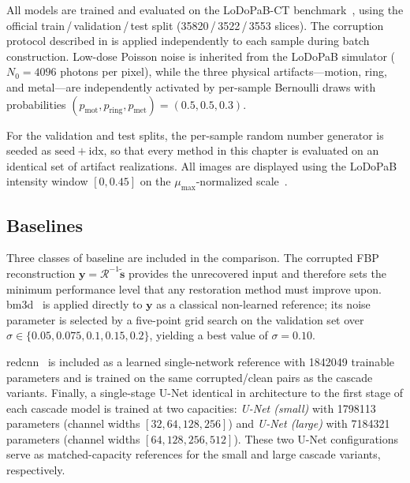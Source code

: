 All models are trained and evaluated on the LoDoPaB-CT benchmark~\cite{Leuschner2021}, using the official train\,/\,validation\,/\,test split (\num{35820}\,/\,\num{3522}\,/\,\num{3553} slices). The corruption protocol described in  is applied independently to each sample during batch construction. Low-dose Poisson noise is inherited from the LoDoPaB simulator (\(N_0=\num{4096}\) photons per pixel), while the three physical artifacts---motion, ring, and metal---are independently activated by per-sample Bernoulli draws with probabilities \((p_\mathrm{mot}, p_\mathrm{ring}, p_\mathrm{met}) = (0.5, 0.5, 0.3)\).

For the validation and test splits, the per-sample random number generator is seeded as \(\mathrm{seed}+\mathrm{idx}\), so that every method in this chapter is evaluated on an identical set of artifact realizations. All images are displayed using the LoDoPaB intensity window \([0, 0.45]\) on the \(\mu_{\max}\)-normalized scale~\cite{Leuschner2021}.
\subsection{Baselines}
\label{subsec:exp_baselines}

Three classes of baseline are included in the comparison. The corrupted FBP reconstruction $\mathbf{y} = \mathcal{R}^{-1}\tilde{\mathbf{s}}$ provides the unrecovered input and therefore sets the minimum performance level that any restoration method must improve upon. \gls{bm3d}~\cite{Dabov2007} is applied directly to $\mathbf{y}$ as a classical non-learned reference; its noise parameter is selected by a five-point grid search on the validation set over $\sigma \in \{0.05, 0.075, 0.1, 0.15, 0.2\}$, yielding a best value of $\sigma = 0.10$.

\gls{redcnn}~\cite{Chen2017} is included as a learned single-network reference with \num{1842049} trainable parameters and is trained on the same corrupted/clean pairs as the cascade variants. Finally, a single-stage U-Net identical in architecture to the first stage of each cascade model is trained at two capacities: \emph{U-Net (small)} with \num{1798113} parameters (channel widths $[32, 64, 128, 256]$) and \emph{U-Net (large)} with \num{7184321} parameters (channel widths $[64, 128, 256, 512]$). These two U-Net configurations serve as matched-capacity references for the small and large cascade variants, respectively.
